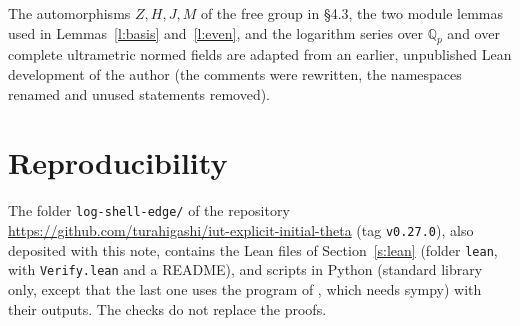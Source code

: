 \documentclass[11pt,a4paper]{article}
\newcommand{\Qp}{\mathbb{Q}_p}
\theoremstyle{plain}
\theoremstyle{definition}
\theoremstyle{remark}
\begin{document}
The automorphisms $Z,H,J,M$ of the free group in \S4.3, the two module lemmas used in Lemmas~\ref{l:basis}
and~\ref{l:even}, and the logarithm series over $\Qp$ and over complete ultrametric normed fields are adapted from an
earlier, unpublished Lean development of the author (the comments were rewritten, the namespaces renamed and unused
statements removed).

\section{Reproducibility}\label{s:repro}
The folder \texttt{log-shell-edge/} of the repository \url{https://github.com/turahigashi/iut-explicit-initial-theta}
(tag \texttt{v0.27.0}), also deposited with this note, contains the Lean files of Section~\ref{s:lean} (folder
\texttt{lean}, with \texttt{Verify.lean} and a README), and scripts in Python (standard library only, except that the
last one uses the program of \cite{Walk}, which needs sympy) with their outputs. The checks do not replace the
proofs.
\end{document}
